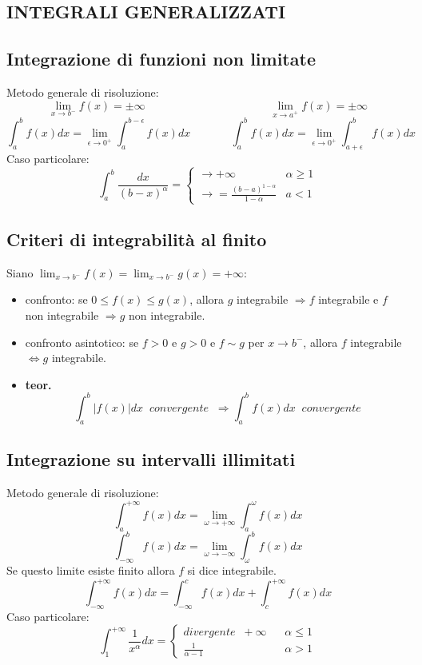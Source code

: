 \documentclass[a4paper, 9pt]{report}
\begin{document}
\subsection*{INTEGRALI GENERALIZZATI}
\subsection*{Integrazione di funzioni non limitate}
Metodo generale di risoluzione:
\[
    \lim_{x\rightarrow b^-} f(x) = \pm \infty \;\;\;\;\;\;\;\;\;\;\;\;\;\;\;\;\;\;\;\;\;\;\;\;\;\;\;\;\;\;\;\;\;\;\;\;\;\;\;\;\lim_{x\rightarrow a^+}f(x) = \pm \infty
\]
\[
    \int_{a}^{b}f(x)dx = \lim_{\epsilon\rightarrow 0^+}\int_{a}^{b-\epsilon}f(x)dx \;\;\;\;\;\;\;\;\;\;\;\;\; \int_{a}^{b}f(x)dx = \lim_{\epsilon\rightarrow 0^+}\int_{a+\epsilon}^{b}f(x)dx 
\]
Caso particolare:
\[
    \int_{a}^{b}\frac{dx}{(b-x)^\alpha} = \begin{cases}
        \rightarrow +\infty &\alpha\geq 1\\
        \rightarrow = \frac{(b-a)^{1-\alpha}}{1-\alpha} &a<1
    \end{cases}
\]
\subsection*{Criteri di integrabilità al finito}
Siano $\lim_{x\rightarrow b^-}f(x) = \lim_{x\rightarrow b^-}g(x) = + \infty$:
\begin{itemize}
    \item confronto: se $0\leq f(x) \leq g(x)$, allora $g$ integrabile $\Rightarrow f$ integrabile e $f$ non integrabile $\Rightarrow g$ non integrabile.
    \item confronto asintotico: se $f>0$ e $g>0$ e $f \sim g$ per $x \rightarrow b^-$, allora $f$ integrabile $\Leftrightarrow g$ integrabile.
    \item \textbf{teor.} 
    \[
        \int_{a}^{b}|f(x)|dx \;\; convergente \;\;\Rightarrow \int_{a}^{b}f(x)dx \;\;convergente
    \]
\end{itemize}
\subsection*{Integrazione su intervalli illimitati}
Metodo generale di risoluzione:
\[
    \int_{a}^{+\infty}f(x) dx = \lim_{\omega\rightarrow +\infty}\int_{a}^{\omega}f(x)dx
\]
\[
    \int_{- \infty}^{b}f(x) dx = \lim_{\omega\rightarrow -\infty}\int_{\omega}^{b}f(x)dx
\]
Se questo limite esiste finito allora $f$ si dice integrabile.
\[
    \int_{-\infty}^{+\infty}f(x) dx = \int_{-\infty}^{c} f(x) dx + \int_{c}^{+\infty}f(x) dx
\]
Caso particolare:
\[
    \int_{1}^{+\infty}\frac{1}{x^\alpha}dx = \begin{cases}
        divergente \;\; +\infty \;\;\; &\alpha\leq 1\\
        \frac{1}{\alpha-1} & \alpha > 1
    \end{cases}
\]
\end{document}
